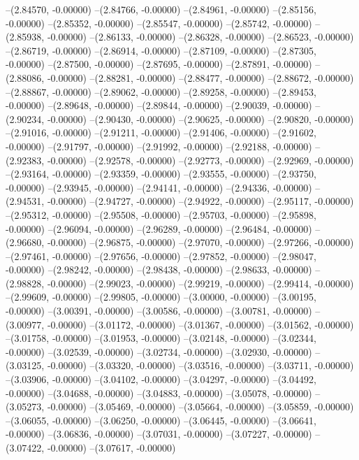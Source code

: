 --(2.84570, -0.00000)
--(2.84766, -0.00000)
--(2.84961, -0.00000)
--(2.85156, -0.00000)
--(2.85352, -0.00000)
--(2.85547, -0.00000)
--(2.85742, -0.00000)
--(2.85938, -0.00000)
--(2.86133, -0.00000)
--(2.86328, -0.00000)
--(2.86523, -0.00000)
--(2.86719, -0.00000)
--(2.86914, -0.00000)
--(2.87109, -0.00000)
--(2.87305, -0.00000)
--(2.87500, -0.00000)
--(2.87695, -0.00000)
--(2.87891, -0.00000)
--(2.88086, -0.00000)
--(2.88281, -0.00000)
--(2.88477, -0.00000)
--(2.88672, -0.00000)
--(2.88867, -0.00000)
--(2.89062, -0.00000)
--(2.89258, -0.00000)
--(2.89453, -0.00000)
--(2.89648, -0.00000)
--(2.89844, -0.00000)
--(2.90039, -0.00000)
--(2.90234, -0.00000)
--(2.90430, -0.00000)
--(2.90625, -0.00000)
--(2.90820, -0.00000)
--(2.91016, -0.00000)
--(2.91211, -0.00000)
--(2.91406, -0.00000)
--(2.91602, -0.00000)
--(2.91797, -0.00000)
--(2.91992, -0.00000)
--(2.92188, -0.00000)
--(2.92383, -0.00000)
--(2.92578, -0.00000)
--(2.92773, -0.00000)
--(2.92969, -0.00000)
--(2.93164, -0.00000)
--(2.93359, -0.00000)
--(2.93555, -0.00000)
--(2.93750, -0.00000)
--(2.93945, -0.00000)
--(2.94141, -0.00000)
--(2.94336, -0.00000)
--(2.94531, -0.00000)
--(2.94727, -0.00000)
--(2.94922, -0.00000)
--(2.95117, -0.00000)
--(2.95312, -0.00000)
--(2.95508, -0.00000)
--(2.95703, -0.00000)
--(2.95898, -0.00000)
--(2.96094, -0.00000)
--(2.96289, -0.00000)
--(2.96484, -0.00000)
--(2.96680, -0.00000)
--(2.96875, -0.00000)
--(2.97070, -0.00000)
--(2.97266, -0.00000)
--(2.97461, -0.00000)
--(2.97656, -0.00000)
--(2.97852, -0.00000)
--(2.98047, -0.00000)
--(2.98242, -0.00000)
--(2.98438, -0.00000)
--(2.98633, -0.00000)
--(2.98828, -0.00000)
--(2.99023, -0.00000)
--(2.99219, -0.00000)
--(2.99414, -0.00000)
--(2.99609, -0.00000)
--(2.99805, -0.00000)
--(3.00000, -0.00000)
--(3.00195, -0.00000)
--(3.00391, -0.00000)
--(3.00586, -0.00000)
--(3.00781, -0.00000)
--(3.00977, -0.00000)
--(3.01172, -0.00000)
--(3.01367, -0.00000)
--(3.01562, -0.00000)
--(3.01758, -0.00000)
--(3.01953, -0.00000)
--(3.02148, -0.00000)
--(3.02344, -0.00000)
--(3.02539, -0.00000)
--(3.02734, -0.00000)
--(3.02930, -0.00000)
--(3.03125, -0.00000)
--(3.03320, -0.00000)
--(3.03516, -0.00000)
--(3.03711, -0.00000)
--(3.03906, -0.00000)
--(3.04102, -0.00000)
--(3.04297, -0.00000)
--(3.04492, -0.00000)
--(3.04688, -0.00000)
--(3.04883, -0.00000)
--(3.05078, -0.00000)
--(3.05273, -0.00000)
--(3.05469, -0.00000)
--(3.05664, -0.00000)
--(3.05859, -0.00000)
--(3.06055, -0.00000)
--(3.06250, -0.00000)
--(3.06445, -0.00000)
--(3.06641, -0.00000)
--(3.06836, -0.00000)
--(3.07031, -0.00000)
--(3.07227, -0.00000)
--(3.07422, -0.00000)
--(3.07617, -0.00000)
